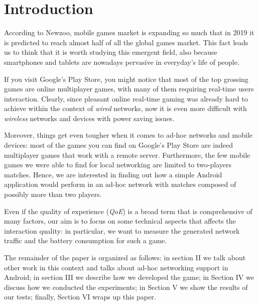 \section{Introduction}
According to Newzoo, mobile games market is expanding so much that in 2019
it is predicted to reach almost half of all the global games
market\cite{bib:newzoo}. This fact leads us to think that it is worth studying
this emergent field, also because smartphones and tablets are nowadays
pervasive in everyday's life of people.

If you visit Google's Play Store, you might notice that most of the top
grossing games are online multiplayer games, with many of them requiring
real-time users interaction. Clearly, since pleasant online real-time gaming
was already hard to achieve within the context of \textit{wired} networks, now
it is even more difficult with \textit{wireless} networks and devices with
power saving issues.

Moreover, things get even tougher when it comes to ad-hoc networks and mobile
devices: most of the games you can find on Google's Play Store are indeed
multiplayer games that work with a remote server. Furthermore, the few mobile
games we were able to find for local networking are limited to two-players
matches. Hence, we are interested in finding out how a simple Android
application would perform in an ad-hoc network with matches composed of
possibly more than two players.

Even if the quality of experience (\textit{QoE}) is a broad term that is
comprehensive of many factors\cite{bib:moeller-qoe}, our aim is to focus on
some technical aspects that affects the interaction quality: in particular, we
want to measure the generated network traffic and the battery consumption for
such a game.

The remainder of the paper is organized as follows: in section II we talk about
other work in this context and talks about ad-hoc networking support in Android;
in section III we describe how we developed the game; in Section IV we discuss
how we conducted the experiments; in Section V we show the results of our tests;
finally, Section VI wraps up this paper.
